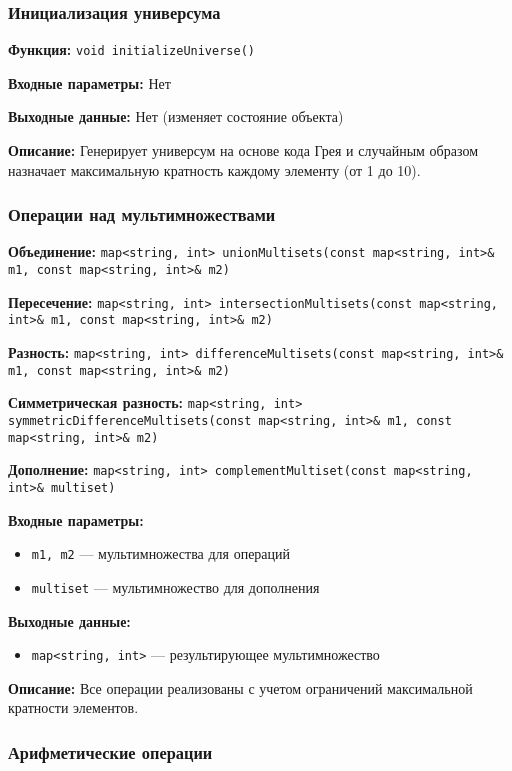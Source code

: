 \documentclass[12pt,a4paper]{article}
\begin{document}
\subsubsection{Инициализация универсума}

\textbf{Функция:} \texttt{void initializeUniverse()}

\textbf{Входные параметры:} Нет

\textbf{Выходные данные:} Нет (изменяет состояние объекта)

\textbf{Описание:} Генерирует универсум на основе кода Грея и случайным образом назначает максимальную кратность каждому элементу (от 1 до 10).

\subsubsection{Операции над мультимножествами}

\textbf{Объединение:} \texttt{map<string, int> unionMultisets(const map<string, int>\& m1, const map<string, int>\& m2)}

\textbf{Пересечение:} \texttt{map<string, int> intersectionMultisets(const map<string, int>\& m1, const map<string, int>\& m2)}

\textbf{Разность:} \texttt{map<string, int> differenceMultisets(const map<string, int>\& m1, const map<string, int>\& m2)}

\textbf{Симметрическая разность:} \texttt{map<string, int> symmetricDifferenceMultisets(const map<string, int>\& m1, const map<string, int>\& m2)}

\textbf{Дополнение:} \texttt{map<string, int> complementMultiset(const map<string, int>\& multiset)}

\textbf{Входные параметры:}
\begin{itemize}
    \item \texttt{m1, m2} — мультимножества для операций
    \item \texttt{multiset} — мультимножество для дополнения
\end{itemize}

\textbf{Выходные данные:}
\begin{itemize}
    \item \texttt{map<string, int>} — результирующее мультимножество
\end{itemize}

\textbf{Описание:} Все операции реализованы с учетом ограничений максимальной кратности элементов.

\subsubsection{Арифметические операции}
\end{document}
